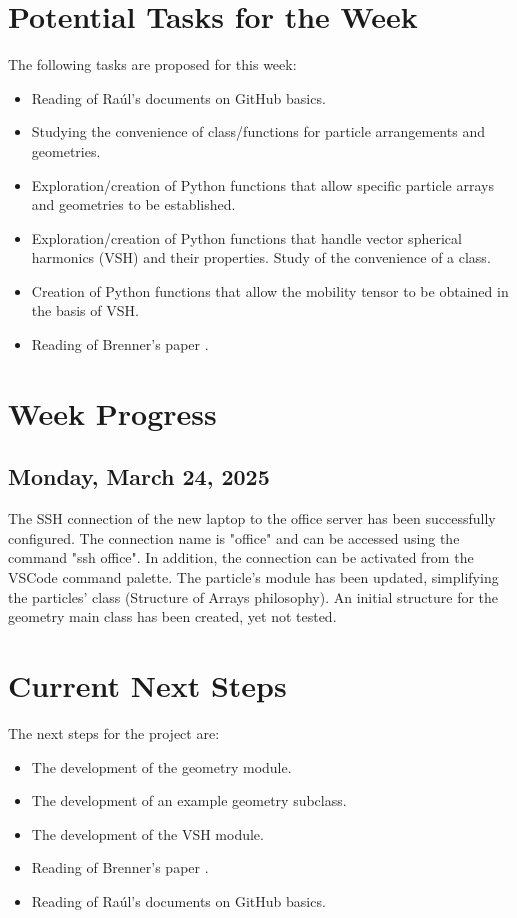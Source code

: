 \documentclass[12pt]{article}
\begin{document}
\section{Potential Tasks for the Week}
The following tasks are proposed for this week:
\begin{itemize}
    \item Reading of Raúl's documents on GitHub basics.
    \item Studying the convenience of class/functions for particle arrangements and geometries.
    \item Exploration/creation of Python functions that allow specific particle arrays and geometries to be established.
    \item Exploration/creation of Python functions that handle vector spherical harmonics (VSH) and their properties. Study of the convenience of a class.
    \item Creation of Python functions that allow the mobility tensor to be obtained in the basis of VSH.
    \item Reading of Brenner's paper \cite{BRENNER1961242}.
\end{itemize}

\section{Week Progress}

\subsection{Monday, March 24, 2025}
The SSH connection of the new laptop to the office server
has been successfully configured. The connection name is
"office" and can be accessed using the command "ssh office".
In addition, the connection can be activated from the VSCode
command palette. The particle's module has been updated,
simplifying the particles' class (Structure of Arrays philosophy).
An initial structure for the geometry main class has been created,
yet not tested.

\section{Current Next Steps}
The next steps for the project are:
\begin{itemize}
    \item The development of the geometry module.
    \item The development of an example geometry subclass.
    \item The development of the VSH module.
    \item Reading of Brenner's paper \cite{BRENNER1961242}.
    \item Reading of Raúl's documents on GitHub basics.
\end{itemize}
\end{document}
